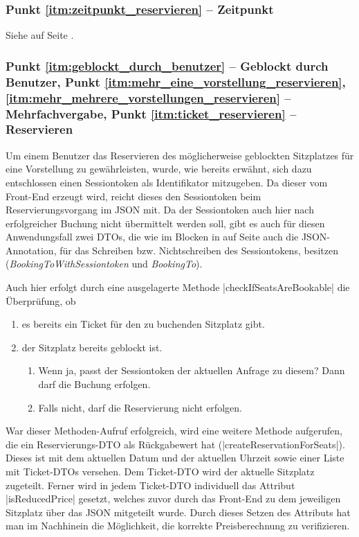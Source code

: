 \subsubsection*{Punkt \ref{itm:zeitpunkt_reservieren} -- Zeitpunkt}
\label{ssssec:Zeitpunkt_reservieren}
Siehe   auf Seite \pageref{ssssec:Zeitpunkt}.

\subsubsection*{Punkt \ref{itm:geblockt_durch_benutzer} -- Geblockt durch Benutzer, Punkt \ref{itm:mehr_eine_vorstellung_reservieren}, \ref{itm:mehr_mehrere_vorstellungen_reservieren} -- Mehrfachvergabe, Punkt \ref{itm:ticket_reservieren} -- Reservieren}
\label{ssssec:geblockt_durch_benutzer}
Um einem Benutzer das Reservieren des möglicherweise geblockten Sitzplatzes für eine Vorstellung zu gewährleisten, wurde, wie bereits erwähnt, sich dazu entschlossen einen Sessiontoken als Identifikator mitzugeben.
Da dieser vom Front-End erzeugt wird, reicht dieses den Sessiontoken beim Reservierungsvorgang im \acs{JSON} mit.
Da der Sessiontoken auch hier nach erfolgreicher Buchung nicht übermittelt werden soll, gibt es auch für diesen Anwendungsfall zwei \acp{DTO}, die wie im  Blocken in  auf Seite \pageref{ssssec:Bezeichner} auch die \acs{JSON}-Annotation, für das Schreiben bzw. Nichtschreiben des Sessiontokens, besitzen (\textit{BookingToWithSessiontoken} und \textit{BookingTo}). 

Auch hier erfolgt durch eine ausgelagerte Methode \jinline |checkIfSeatsAreBookable| die Überprüfung, ob
\begin{enumerate}
	\item es bereits ein Ticket für den zu buchenden Sitzplatz gibt.
	\item der Sitzplatz bereits geblockt ist.
	\begin{enumerate}
		\item Wenn ja, passt der Sessiontoken der aktuellen Anfrage zu diesem? Dann darf die Buchung erfolgen.
		\item Falls nicht, darf die Reservierung nicht erfolgen.
	\end{enumerate}
\end{enumerate}

War dieser Methoden-Aufruf erfolgreich, wird eine weitere Methode aufgerufen, die ein Reservierungs-\acs{DTO} als Rückgabewert hat (\jinline |createReservationForSeats|). \\
Dieses ist mit dem aktuellen Datum und der aktuellen Uhrzeit sowie einer Liste mit Ticket-\acp{DTO} versehen.
Dem Ticket-\acs{DTO} wird der aktuelle Sitzplatz zugeteilt.
Ferner wird in jedem Ticket-\acs{DTO} individuell das Attribut \jinline |isReducedPrice| gesetzt, welches zuvor durch das Front-End zu dem jeweiligen Sitzplatz über das \acs{JSON} mitgeteilt wurde.
Durch dieses Setzen des Attributs hat man im Nachhinein die Möglichkeit, die korrekte Preisberechnung zu verifizieren.

